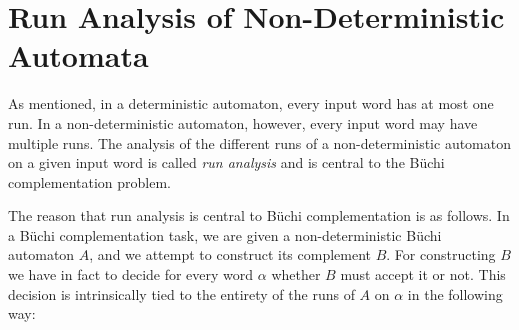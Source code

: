 




\section{Run Analysis of Non-Deterministic Automata}
\label{2_run_analysis}
As mentioned, in a deterministic automaton, every input word has at most one run. In a non-deterministic automaton, however, every input word may have multiple runs. The analysis of the different runs of a non-deterministic automaton on a given input word is called \textit{run analysis} and is central to the Büchi complementation problem.

The reason that run analysis is central to Büchi complementation is as follows. In a Büchi complementation task, we are given a non-deterministic Büchi automaton $A$, and we attempt to construct its complement $B$. For constructing $B$ we have in fact to decide for every word $\alpha$ whether $B$ must accept it or not. This decision is intrinsically tied to the entirety of the runs of $A$ on $\alpha$ in the following way:

